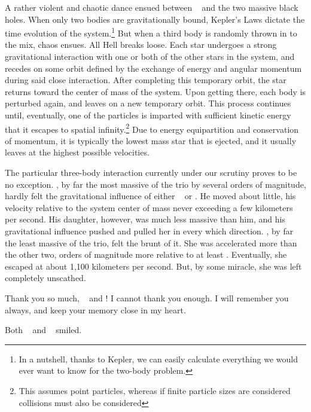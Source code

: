 \documentclass[main.tex]{subfiles}
\begin{document}
\par \nar A rather violent and chaotic dance ensued between \rmelectra~ and the two massive black holes.  When only two bodies are gravitationally bound, Kepler's Laws dictate the time evolution of the system.\footnote{In a nutshell, thanks to Kepler, we can easily calculate everything we would ever want to know for the two-body problem.}  But when a third body is randomly thrown in to the mix, chaos ensues.  All Hell breaks loose.  Each star undergoes a strong gravitational interaction with one or both of the other stars in the system, and recedes on some orbit defined by the exchange of energy and angular momentum during said close interaction.  After completing this temporary orbit, the star returns toward the center of mass of the system.  Upon getting there, each body is perturbed again, and leaves on a new temporary orbit.  This process continues until, eventually, one of the particles is imparted with sufficient kinetic energy that it escapes to spatial infinity.\footnote{This assumes point particles, whereas if finite particle sizes are considered collisions must also be considered}  Due to energy equipartition and conservation of momentum, it is typically the lowest mass star that is ejected, and it usually leaves at the highest possible velocities.  

\par \nar The particular three-body interaction currently under our scrutiny proves to be no exception.  \rmchiron, by far the most massive of the trio by several orders of magnitude, hardly felt the gravitational influence of either \rmelectra~ or \rmhippe.  He moved about little, his velocity relative to the system center of mass never exceeding a few kilometers per second.  His daughter, however, was much less massive than him, and his gravitational influence pushed and pulled her in every which direction.  \rmelectra, by far the least massive of the trio, felt the brunt of it.  She was accelerated more than the other two, orders of magnitude more relative to at least \rmchiron.  Eventually, she escaped at about 1,100 kilometers per second.  But, by some miracle, she was left completely unscathed.%

\par \Electra Thank you so much, \rmchiron~ and \rmhippe!  I cannot thank you enough.  I will remember you always, and keep your memory close in my heart.

\par \nar Both \rmchiron~ and \rmhippe~ smiled.
\end{document}

